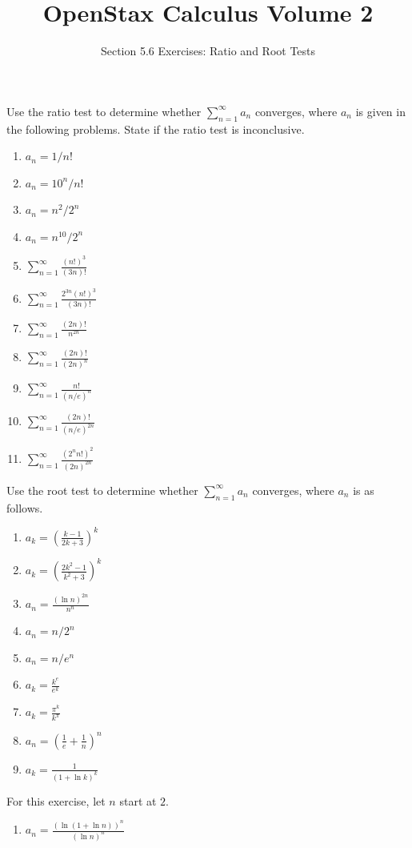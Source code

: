 \documentclass{exercises}
\title{OpenStax Calculus Volume 2}
\subtitle{Section 5.6 Exercises: Ratio and Root Tests}
\author{}
\date{}
\begin{document}
\maketitle


Use the ratio test to determine whether $\sum_{n=1}^{\infty}a_{n}$ converges, where $a_{n}$ is given in the following problems. State if the ratio test is inconclusive.

\begin{enumerate}[start=1]
\item $a_{n}=1/n!$
\item $a_{n}=10^{n}/n!$
\item $a_{n}=n^{2}/2^{n}$
\item $a_{n}=n^{10}/2^{n}$
\item $\sum_{n=1}^{\infty}\frac{{(n!)}^{3}}{(3n)!}$
\item $\sum_{n=1}^{\infty}\frac{2^{3n}{(n!)}^{3}}{(3n)!}$
\item $\sum_{n=1}^{\infty}\frac{(2n)!}{n^{2n}}$
\item $\sum_{n=1}^{\infty}\frac{(2n)!}{{(2n)}^{n}}$
\item $\sum_{n=1}^{\infty}\frac{n!}{{(n/e)}^{n}}$
\item $\sum_{n=1}^{\infty}\frac{(2n)!}{{(n/e)}^{2n}}$
\item $\sum_{n=1}^{\infty}\frac{{(2^{n}n!)}^{2}}{{(2n)}^{2n}}$
\end{enumerate}

Use the root test to determine whether $\sum_{n=1}^{\infty}a_{n}$ converges, where $a_{n}$ is as follows.

\begin{enumerate}[resume]
\item $a_{k}={(\frac{k-1}{2k+3})}^{k}$
\item $a_{k}={(\frac{2k^{2}-1}{k^{2}+3})}^{k}$
\item $a_{n}=\frac{{(\ln n)}^{2n}}{n^{n}}$
\item $a_{n}=n/2^{n}$
\item $a_{n}=n/e^{n}$
\item $a_{k}=\frac{k^{e}}{e^{k}}$
\item $a_{k}=\frac{\pi^{k}}{k^{\pi}}$
\item $a_{n}={(\frac{1}{e}+\frac{1}{n})}^{n}$
\item $a_{k}=\frac{1}{{(1+\ln k)}^{k}}$
\end{enumerate}

For this exercise, let $n$ start at $2$.

\begin{enumerate}[resume]
\item $a_{n}=\frac{{(\ln(1+\ln n))}^{n}}{{(\ln n)}^{n}}$
\end{enumerate}
\end{document}
